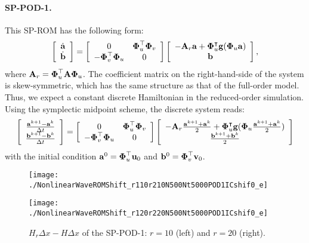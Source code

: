 \documentclass[11pt]{article}
\begin{document}
\paragraph{SP-POD-1.}  This SP-ROM has the following form: 
\begin{equation*}
\left[
\begin{array}{c}
\dot{{\bf a}}\\
\dot{{\bf b}}
\end{array}
\right] =
\left[
\begin{array}{cc}
0 & \boldsymbol{\Phi}_u^\top \boldsymbol{\Phi}_v \\
-\boldsymbol{\Phi}_v^\top \boldsymbol{\Phi}_u & 0
\end{array}
\right]
\left[
\begin{array}{c}
-{\bf A}_r {\bf a} + \boldsymbol{\Phi}_u^\intercal {\bf g}(\boldsymbol{\Phi}_u {\bf a}) \\
{\bf b}
\end{array}
\right],
\end{equation*}
where ${\bf A}_r = \boldsymbol{\Phi}_u^\top {\bf A} \boldsymbol{\Phi}_u$. 
The coefficient matrix on the right-hand-side of the system is skew-symmetric, which has the same structure as that of the full-order model.
Thus, we expect a constant discrete Hamiltonian in the reduced-order simulation. 
Using the symplectic midpoint scheme, the discrete system reads: 
\begin{equation}
\left[
\begin{array}{c}
\frac{{\bf a}^{k+1}-{\bf a}^{k}}{\Delta t}\\
\frac{{\bf b}^{k+1}-{\bf b}^{k}}{\Delta t}
\end{array}
\right] =
\left[
\begin{array}{cc}
0 & \boldsymbol{\Phi}_u^\top \boldsymbol{\Phi}_v \\
-\boldsymbol{\Phi}_v^\top \boldsymbol{\Phi}_u & 0
\end{array}
\right]
\left[
\begin{array}{c}
-{\bf A}_r \frac{{\bf a}^{k+1}+{\bf a}^k}{2} + \boldsymbol{\Phi}_u^\intercal {\bf g}(\boldsymbol{\Phi}_u \frac{{\bf a}^{k+1}+{\bf a}^k}{2}) \\
\frac{{\bf b}^{k+1}+{\bf b}^k}{2}
\end{array}
\right]
\end{equation}
with the initial condition ${\bf a}^0 = \boldsymbol{\Phi}_u^\top {\bf u}_0$ and ${\bf b}^0 = \boldsymbol{\Phi}_v^\top {\bf v}_0$.

\begin{figure}[htb]
\centering
\begin{minipage}[ht]{0.45\linewidth}
\texttt{[image: ./NonlinearWaveROMShift\_r110r210N500Nt5000POD1ICshif0\_e]}
\end{minipage}
\hspace{1cm}
\begin{minipage}[ht]{0.45\linewidth}
\texttt{[image: ./NonlinearWaveROMShift\_r120r220N500Nt5000POD1ICshif0\_e]}
\end{minipage}
\caption{
$H_r\Delta x-H\Delta x$ of the SP-POD-1: $r=10$ (left) and $r=20$ (right). 
}\label{Fig: sp-pod1}
\end{figure}
\end{document}
